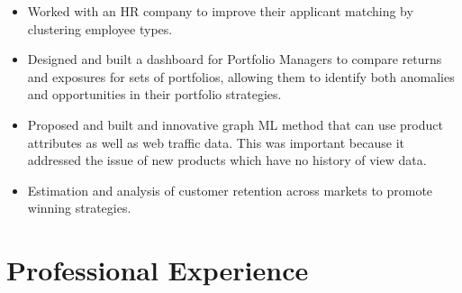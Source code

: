 \documentclass[10pt, letterpaper]{article} %
\begin{document}
\begin{itemize}
\item Worked with an HR company to improve their applicant matching by clustering employee types.
\item Designed and built a dashboard for Portfolio Managers to compare returns and exposures for sets of portfolios, allowing them to identify both anomalies and opportunities in their portfolio strategies. 
 \item  Proposed and built and innovative graph ML
  method that can use product attributes as well as web traffic data.  This was important because
  it addressed the issue of new products which have no 
    history of view data.

\item Estimation and analysis of customer retention across markets to promote winning strategies. 
\end{itemize}




\vspace{3pt}



\hypertarget{professional-experience}{\section{\texorpdfstring{
{ \textbf{ {Professional Experience}}}}{Professional Experience}}\label{professional-experience}}

\end{document}

